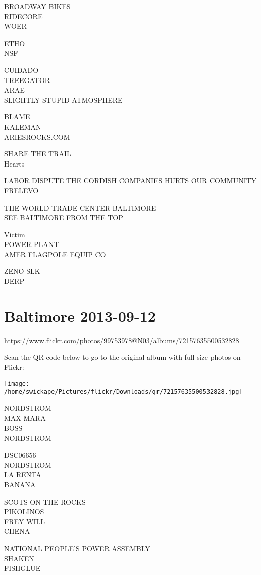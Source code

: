 \documentclass[10pt,letterpaper]{article}
\begin{document}
BROADWAY BIKES\\
RIDECORE\\
WOER

ETHO\\
NSF

CUIDADO\\
TREEGATOR\\
ARAE\\
SLIGHTLY STUPID ATMOSPHERE

BLAME\\
KALEMAN\\
ARIESROCKS.COM

SHARE THE TRAIL\\
Hearts

LABOR DISPUTE THE CORDISH COMPANIES HURTS OUR COMMUNITY\\
FRELEVO

THE WORLD TRADE CENTER BALTIMORE\\
SEE BALTIMORE FROM THE TOP

Victim\\
POWER PLANT\\
AMER FLAGPOLE EQUIP CO

ZENO SLK\\
DERP
\pagebreak

\section*{Baltimore 2013-09-12}

\url{https://www.flickr.com/photos/99753978@N03/albums/72157635500532828}

Scan the QR code below to go to the original album with full-size photos on Flickr:

\texttt{[image: /home/swickape/Pictures/flickr/Downloads/qr/72157635500532828.jpg]}
\pagebreak

NORDSTROM\\
MAX MARA\\
BOSS\\
NORDSTROM

DSC06656\\
NORDSTROM\\
LA RENTA\\
BANANA

SCOTS ON THE ROCKS\\
PIKOLINOS\\
FREY WILL\\
CHENA

NATIONAL PEOPLE'S POWER ASSEMBLY\\
SHAKEN\\
FISHGLUE
\end{document}
